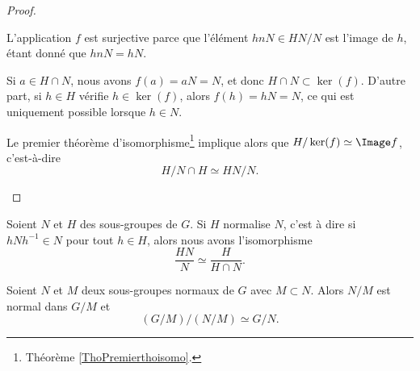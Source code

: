 \begin{proof}
\begin{enumerate}
		      \begin{subproof}
			      L'application \( f\) est surjective parce que l'élément \( hnN\in HN/N\) est l'image de \( h\), étant donné que \( hnN=hN\).

			      \spitem[\( \ker(f) = H\cap N\)]
			      Si \( a\in H\cap N\), nous avons \( f(a) =aN = N\), et donc \( H\cap N\subset \ker(f)\). D'autre part, si \( h\in H\) vérifie \( h\in\ker(f)\), alors \( f(h)=hN=N\), ce qui est uniquement possible lorsque \( h\in N\).

		      \end{subproof}
              Le premier théorème d'isomorphisme\footnote{Théorème \ref{ThoPremierthoisomo}.} implique alors que \( H/\ker(f)\simeq \Image f\), c'est-à-dire
		      \begin{equation}
			      H/N\cap H\simeq HN/N.
		      \end{equation}
	\end{enumerate}
\end{proof}

\begin{proposition}     \label{PROPooVBGMooPTlyLF}
	Soient \( N\) et \( H\) des sous-groupes de \( G\). Si \( H\) normalise \( N\), c'est à dire si \( hNh^{-1}\in N\) pour tout \( h\in H\), alors nous avons l'isomorphisme
	\begin{equation}
		\frac{ HN }{ N }\simeq\frac{ H }{ H\cap N }.
	\end{equation}
\end{proposition}

\begin{theorem}  \label{ThoezgBep}
	Soient \( N\) et \( M\) deux sous-groupes normaux de \( G\) avec \( M\subset N\). Alors \( N/M\) est normal dans \( G/M\) et
	\begin{equation}
		(G/M)/(N/M)\simeq G/N.
	\end{equation}
\end{theorem}


